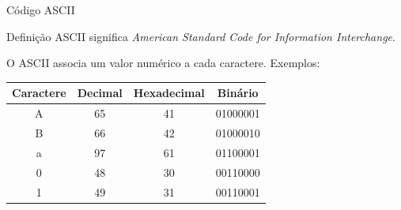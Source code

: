 \begin{frame}{Código ASCII}
    \small
    \begin{block}{Definição}
        ASCII significa
        \textit{American Standard Code for Information Interchange}.
    \end{block}
    O ASCII associa um valor numérico a cada caractere.
    Exemplos:
    \begin{center}
        \begin{tabular}{c|c|c|c}
            \textbf{Caractere} &
            \textbf{Decimal} &
            \textbf{Hexadecimal} &
            \textbf{Binário} \\ \hline

            A & 65 & 41 & 01000001 \\
            B & 66 & 42 & 01000010 \\
            a & 97 & 61 & 01100001 \\
            0 & 48 & 30 & 00110000 \\
            1 & 49 & 31 & 00110001
        \end{tabular}
    \end{center}

\end{frame}